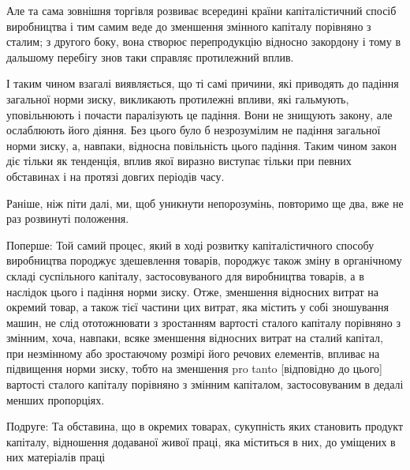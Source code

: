 Але та сама зовнішня торгівля розвиває всередині країни капіталістичний спосіб виробництва і тим
самим веде до зменшення змінного капіталу порівняно з сталим; з другого боку, вона створює
перепродукцію відносно закордону і тому в дальшому перебігу знов таки справляє протилежний вплив.

І    таким чином взагалі виявляється, що ті самі причини, які приводять до падіння загальної норми
зиску, викликають протилежні впливи, які гальмують, уповільнюють і почасти паралізують це падіння.
Вони не знищують закону, але ослаблюють його діяння. Без цього було б незрозумілим не падіння
загальної норми зиску, а, навпаки, відносна повільність цього падіння. Таким чином закон діє тільки
як тенденція, вплив якої виразно виступає тільки при певних обставинах і на протязі довгих періодів
часу.

Раніше, ніж піти далі, ми, щоб уникнути непорозумінь, повторимо ще два, вже не раз розвинуті
положення.

Поперше: Той самий процес, який в ході розвитку капіталістичного способу виробництва породжує
здешевлення товарів, породжує також зміну в органічному складі суспільного капіталу, застосовуваного
для виробництва товарів, а в наслідок цього і падіння норми зиску. Отже, зменшення відносних витрат
на окремий товар, а також тієї частини цих витрат, яка містить у собі зношування машин, не слід
ототожнювати з зростанням вартості сталого капіталу порівняно з змінним, хоча, навпаки, всяке
зменшення відносних витрат на сталий капітал, при незмінному або зростаючому розмірі його речових
елементів, впливає на підвищення норми зиску, тобто на зменшення pro tanto [відповідно до цього]
вартості сталого капіталу порівняно з змінним капіталом, застосовуваним в дедалі менших пропорціях.

Подруге: Та обставина, що в окремих товарах, сукупність яких становить продукт капіталу, відношення
додаваної живої праці, яка міститься в них, до уміщених в них матеріалів праці
\parbreak{}  %
